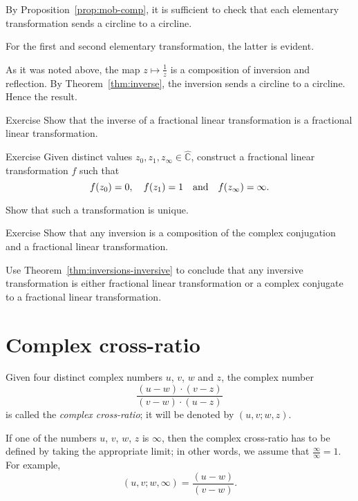 By Proposition~\ref{prop:mob-comp},
it is sufficient to check that each elementary transformation sends a circline to a circline.

For the first and second elementary transformation, the latter is evident.

As it was noted above,
the map $z\mapsto\tfrac1z$ is a composition of inversion and reflection.
By Theorem~\ref{thm:inverse}, the inversion sends a circline to a circline.
Hence the result.
\qeds

\begin{thm}{Exercise}\label{ex:inverse-Mob}
Show that the inverse of a fractional linear transformation is a fractional linear transformation.
\end{thm}


\begin{thm}{Exercise}\label{ex:3-point-Mob}
Given distinct values $z_0,z_1,z_\infty\in \hat{\mathbb{C}}$,
construct a fractional linear transformation $f$ such that 
\[f(z_0)=0,
\quad 
f(z_1)=1
\quad\text{and}\quad 
f(z_\infty)\z=\infty.\]

Show that such a transformation is unique.
\end{thm}

\begin{thm}{Exercise}\label{ex:inversion-Mob}
Show that any inversion is a composition of the complex conjugation and a fractional linear transformation.

Use Theorem~\ref{thm:inversions-inversive} to conclude that any inversive transformation is either fractional linear transformation or a complex conjugate to a fractional linear transformation.
\end{thm}



\section*{Complex cross-ratio}

Given four distinct complex numbers $u$, $v$, $w$ and $z$,
the complex number
$$
\frac{(u-w)\cdot(v-z)}{(v-w)\cdot(u-z)}$$
is called the \emph{complex cross-ratio}; 
it will be denoted by $(u,v;w,z)$.

If one of the numbers $u$, $v$, $w$, $z$ is $\infty$, 
then the complex cross-ratio has to be defined by taking the appropriate limit; in other words, we assume that $\frac\infty\infty=1$.
For example,
$$(u, v; w, \infty)=\frac{(u-w)}{(v-w)}.$$

